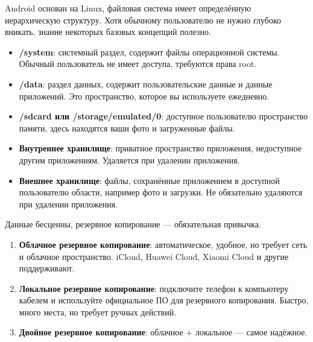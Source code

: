 
Android основан на Linux, файловая система имеет определённую иерархическую структуру. Хотя обычному пользователю не нужно глубоко вникать, знание некоторых базовых концепций полезно.


\begin{itemize}
  \item \textbf{/system}: системный раздел, содержит файлы операционной системы. Обычный пользователь не имеет доступа, требуются права root.
  \item \textbf{/data}: раздел данных, содержит пользовательские данные и данные приложений. Это пространство, которое вы используете ежедневно.
  \item \textbf{/sdcard или /storage/emulated/0}: доступное пользователю пространство памяти, здесь находятся ваши фото и загруженные файлы.
\end{itemize}


\begin{itemize}
  \item \textbf{Внутреннее хранилище}: приватное пространство приложения, недоступное другим приложениям. Удаляется при удалении приложения.
  \item \textbf{Внешнее хранилище}: файлы, сохранённые приложением в доступной пользователю области, например фото и загрузки. Не обязательно удаляются при удалении приложения.
\end{itemize}


Данные бесценны, резервное копирование — обязательная привычка.


\begin{enumerate}
  \item \textbf{Облачное резервное копирование}: автоматическое, удобное, но требует сеть и облачное пространство. iCloud, Huawei Cloud, Xiaomi Cloud и другие поддерживают.
  \item \textbf{Локальное резервное копирование}: подключите телефон к компьютеру кабелем и используйте официальное ПО для резервного копирования. Быстро, много места, но требует ручных действий.
  \item \textbf{Двойное резервное копирование}: облачное + локальное — самое надёжное.
\end{enumerate}

